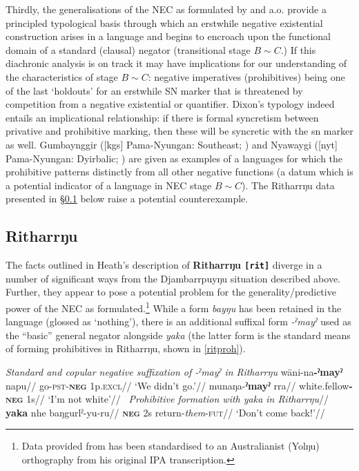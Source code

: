 \documentclass[usenames,dvipsnames,11pt]{article}
\begin{document}
{{ Thirdly, the generalisations of the NEC as formulated by \citet{Croft1991} and \citet{Veselinova2016} a.o. provide a principled typological basis through which an erstwhile negative existential construction arises in a language and begins to encroach upon the functional domain of a standard (clausal) negator (transitional stage $B\sim C$.) If this diachronic analysis is on track it may have implications for our understanding of the characteristics of stage $B\sim C$: negative imperatives (prohibitives) being one of the last `holdouts' for an erstwhile SN marker that is threatened by competition from a negative existential or quantifier.%
 Dixon's typology \citeyearpar[84]{Dixon2002a} indeed entails an implicational relationship: if there is formal syncretism between privative and prohibitive marking, then these will be syncretic with the \gls{sn} marker as well. Gumbaynggir ([\gls{kgs}] Pama-Nyungan: Southeast; \citealt{Eades1979}) and Nyawaygi ([\gls{nyt}] Pama-Nyungan: Dyirbalic; \citealt{Dixon1983}) are given as examples of a languages for which the prohibitive patterns distinctly from all other negative functions (a datum which is a potential indicator of a language in NEC stage $B\sim C$). The Ritharrŋu data presented in §\ref{secrit} below raise a potential counterexample.
\label{secdjr}

\subsection{Ritharrŋu}\label{secrit}


The facts outlined in Heath's \citeyear{Heath1980} description of {\bf Ritharrŋu {\tt[rit]}} diverge in a number of significant ways from the Djambarrpuyŋu situation described above. Further, they appear to pose a potential problem for the generality/predictive power of the NEC as formulated.\footnote{Data provided from \citet{Heath1980} has been standardised to an Australianist (Yolŋu) orthography from his original IPA transcription.} While a form \textit{bayŋu} has been retained in the language (glossed as `nothing'), there is an additional suffixal form \textit{-ˀmayˀ} used as the ``basic'' \citep[101]{Heath1980} general negator alongside \textit{yaka} (the latter form is the standard means of forming prohibitives in Ritharrŋu, shown in \ref{ritproh}).

\pex\textit{Standard and copular negative suffixation of {\em -ˀmayˀ} in Ritharrŋu}
\a\begingl\gla wäni-na\textbf{-ˀmayˀ} napu//
\glb go-\textsc{pst-\textbf{neg}} 1p\textsc{.excl}//
\glft `We didn't go.'//\endgl
\a\begingl\gla munaŋa-\textbf{ˀmayˀ} rra//
\glb white.fellow\textsc{\textbf{-neg}} 1s//
\glft`I'm not white'//\endgl\xe 
\pex~\label{ritproh}\begingl\glpreamble\textit{Prohibitive formation with {\em yaka} in Ritharrŋu}//
\gla \textbf{yaka} nhe baŋgurlˀ-yu-ru//
\glb \textsc{\textbf{neg}} 2s return-\textit{them}-\textsc{fut}//
\glft`Don't come back!'//\endgl\xe

}}
\end{document}
